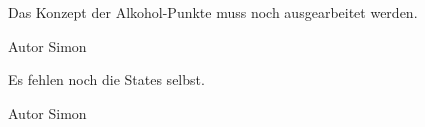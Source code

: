 
\begin{DoxyRefList}
\item[\label{todo__todo000001}%
\hypertarget{todo__todo000001}{}%
Klasse \hyperlink{structscoreStruct}{score\-Struct} ]Das Konzept der Alkohol-\/\-Punkte muss noch ausgearbeitet werden. \begin{DoxyAuthor}{Autor}
Simon  
\end{DoxyAuthor}

\item[\label{todo__todo000002}%
\hypertarget{todo__todo000002}{}%
Klasse \hyperlink{structstateStruct}{state\-Struct} ]Es fehlen noch die States selbst. \begin{DoxyAuthor}{Autor}
Simon 
\end{DoxyAuthor}

\end{DoxyRefList}
